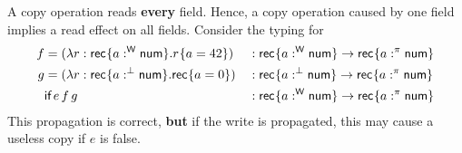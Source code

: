 \documentclass{llncs}
\begin{document}
A copy operation reads \textbf{every} field. Hence, a copy operation
caused by one field implies a read effect on all fields.
\clearpage{}
Consider the typing for 
\begin{align*}
  f
  &=(\lambda r:\textsf{rec}^{{}}\{ a:^\textsf{W} \textsf{num}\}. r^{{}}\{a=42\})
  &&: \textsf{rec}^{{}}\{ a:^\textsf{W} \textsf{num}\} \to \textsf{rec}^{{}}\{ a:^\pi \textsf{num}\}
  \\
  g
  &=(\lambda r:\textsf{rec}^{{}}\{a :^\bot \textsf{num}\}. \textsf{rec}^{{}}\{a = 0\})
  &&: \textsf{rec}^{{}}\{a :^\bot \textsf{num}\} \to \textsf{rec}^{{}}\{ a:^\pi \textsf{num}\}
  \\
  &\textsf{if}\,e\,f\,{g}
  &&: \textsf{rec}^{{}}\{ a:^\textsf{W} \textsf{num}\} \to \textsf{rec}^{{}}\{ a:^\pi \textsf{num}\}
\end{align*}
This propagation is correct,
\textbf{but} if the write is propagated, this may cause a useless copy if $e$ is false.
\end{document}
